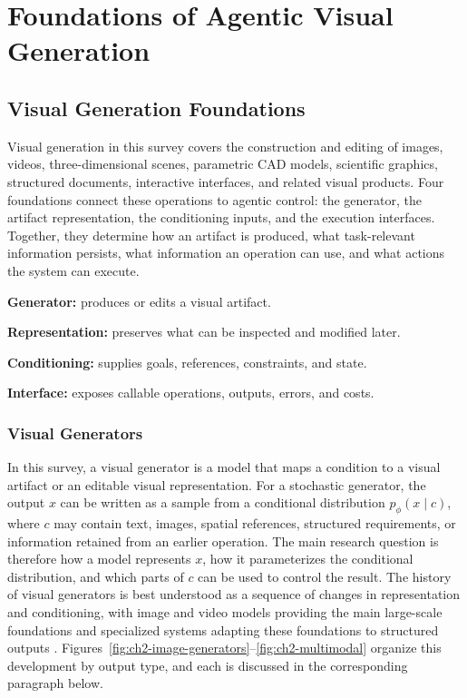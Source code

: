 \section{Foundations of Agentic Visual Generation}
\label{sec:foundations}

\subsection{Visual Generation Foundations}
\label{sec:visual-foundations}

Visual generation in this survey covers the construction and editing of images, videos, three-dimensional scenes, parametric CAD models, scientific graphics, structured documents, interactive interfaces, and related visual products. Four foundations connect these operations to agentic control: the generator, the artifact representation, the conditioning inputs, and the execution interfaces. Together, they determine how an artifact is produced, what task-relevant information persists, what information an operation can use, and what actions the system can execute.

\begin{keytakeaway}
\begin{keypoints}
  \item \textbf{Generator:} produces or edits a visual artifact.
  \item \textbf{Representation:} preserves what can be inspected and modified later.
  \item \textbf{Conditioning:} supplies goals, references, constraints, and state.
  \item \textbf{Interface:} exposes callable operations, outputs, errors, and costs.
\end{keypoints}
\end{keytakeaway}

\subsubsection{Visual Generators}

In this survey, a visual generator is a model that maps a condition to a visual artifact or an editable visual representation. For a stochastic generator, the output $x$ can be written as a sample from a conditional distribution $p_{\phi}(x\mid c)$, where $c$ may contain text, images, spatial references, structured requirements, or information retained from an earlier operation. The main research question is therefore how a model represents $x$, how it parameterizes the conditional distribution, and which parts of $c$ can be used to control the result. The history of visual generators is best understood as a sequence of changes in representation and conditioning, with image and video models providing the main large-scale foundations and specialized systems adapting these foundations to structured outputs \cite{he2024llms,yang2025textimage,wang2025imageediting,yin2025spatiotemporal,wu2026visualgeneration}. Figures~\ref{fig:ch2-image-generators}--\ref{fig:ch2-multimodal} organize this development by output type, and each is discussed in the corresponding paragraph below.

